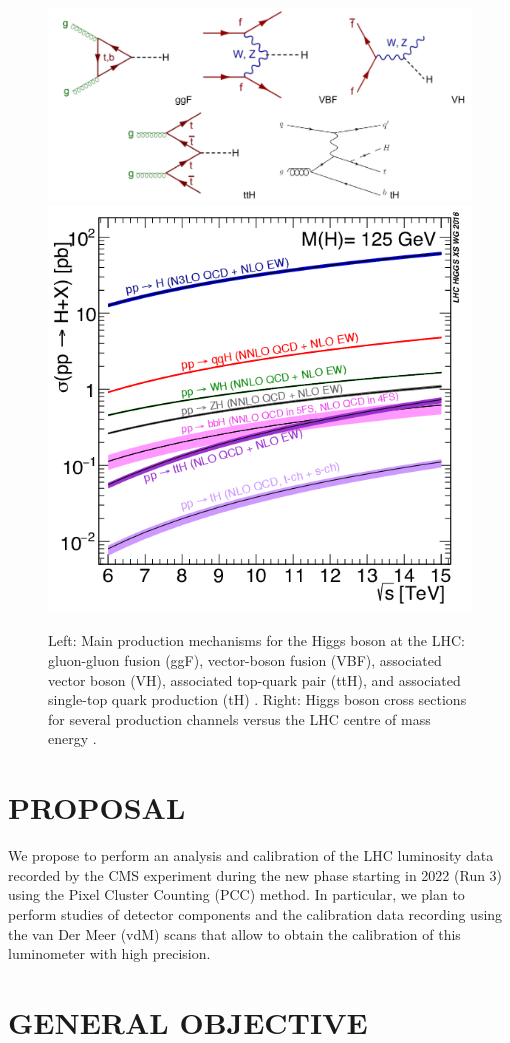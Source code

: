 \documentclass[final,12pt]{article}
\begin{document}
 \begin{figure}[H]
   \centering
   \includegraphics[width=0.6\columnwidth]{./pg.png}
   \includegraphics[width=0.39\columnwidth]{./Higgs-cross-sections-for-several-production-channels.png}
   \caption{
     Left: Main production mechanisms for the Higgs boson at the LHC: gluon-gluon fusion (ggF), vector-boson fusion (VBF), associated vector boson (VH), associated top-quark pair (ttH), and  associated single-top quark production (tH)  \cite{Grojean:2017hsb-corr}  \cite{Khachatryan:2015ota} .
     Right: Higgs boson cross sections for several production channels versus the LHC centre of mass energy  \cite{Cepeda:2019klc-corr}.
   }
   \label{figureKappasUncs}
 \end{figure}




\section{PROPOSAL}

We propose to perform an analysis and calibration of the LHC luminosity data recorded by the CMS experiment during the new phase starting in 2022 (Run 3) using the Pixel Cluster Counting (PCC) method.
In particular, we plan to perform studies of detector components and the calibration data recording using the van Der Meer (vdM) scans that allow to obtain the calibration of this luminometer with high precision.

\section{GENERAL OBJECTIVE}
\end{document}
